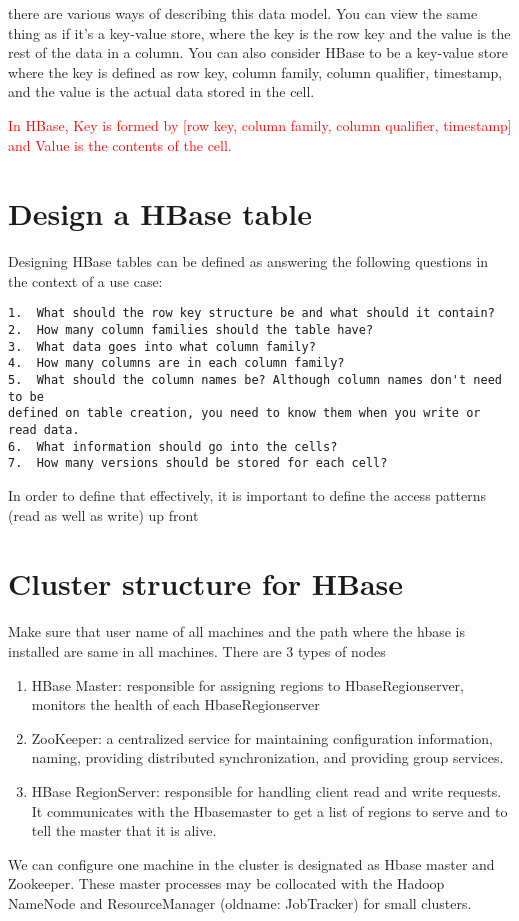 there are various ways of describing this data model. You can
view the same thing as if it's a key-value store, where the key
is the row key and the value is the rest of the data in a column.
You can also consider
HBase to be a key-value store where the key is defined as row key, column family,
column qualifier, timestamp, and the value is the actual data stored in the cell.

\textcolor{red}{In HBase, Key is
formed by [row key, column family, column qualifier, timestamp] and Value is the
contents of the cell.}

\section{Design a HBase table}

Designing HBase tables
can be defined as answering the following questions in the context of a use case:
\begin{verbatim}
1.	What should the row key structure be and what should it contain?
2.	How many column families should the table have?
3.	What data goes into what column family?
4.	How many columns are in each column family?
5.	What should the column names be? Although column names don't need to be
defined on table creation, you need to know them when you write or read data.
6.	What information should go into the cells?
7.	How many versions should be stored for each cell?
\end{verbatim}
In
order to define that effectively, it is important to define the access patterns (read
as well as write) up front



\section{Cluster structure for HBase}


Make sure that user name of all machines and the path where the hbase is
installed are same in all machines. There are 3 types of nodes
\begin{enumerate}
  \item HBase Master:  responsible for assigning regions to HbaseRegionserver,
  monitors the health of each HbaseRegionserver
  
  \item ZooKeeper: a centralized service for maintaining configuration
  information, naming, providing        distributed synchronization, and providing group services.
  
  \item HBase RegionServer:  responsible for handling client read and write
  requests. It communicates with the Hbasemaster to get a list of regions to serve and to tell the master that it is alive.
\end{enumerate}
We can configure one machine in the cluster is designated as Hbase master and
Zookeeper. These master processes may be collocated with the Hadoop NameNode and
ResourceManager (oldname: JobTracker) for small clusters.

